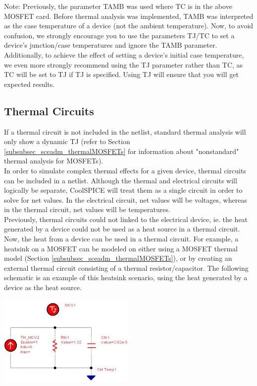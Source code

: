 Note: Previously, the parameter TAMB was used where TC is in the above MOSFET card. Before thermal analysis was implemented, TAMB was interpreted as the case temperature of a device (not the ambient temperature). Now, to avoid confusion, we strongly encourage you to use the parameters TJ/TC to set a device's junction/case temperatures and ignore the TAMB parameter. Additionally, to achieve the effect of setting a device's initial case temperature, we even more strongly recommend using the TJ parameter rather than TC, as TC will be set to TJ if TJ is specified. Using TJ will ensure that you will get expected results.
	
\subsection{Thermal Circuits}
\label{subsec_sceadm_thermalCircuits}

If a thermal circuit is not included in the netlist, standard thermal analysis will only show a dynamic TJ (refer to Section \ref{subsubsec_sceadm_thermalMOSFETs} for information about "nonstandard" thermal analysis for MOSFETs). \\

In order to simulate complex thermal effects for a given device, thermal circuits can be included in a netlist. Although the thermal and electrical circuits will logically be separate, CoolSPICE will treat them as a single circuit in order to solve for net values. In the electrical circuit, net values will be voltages, whereas in the thermal circuit, net values will be temperatures. \\

Previously, thermal circuits could not linked to the electrical device, ie. the heat generated by a device could not be used as a heat source in a thermal circuit. Now, the heat from a device can be used in a thermal circuit. For example, a heatsink on a MOSFET can be modeled on either using a MOSFET thermal model (Section \ref{subsubsec_sceadm_thermalMOSFETs}), or by creating an external thermal circuit consisting of a thermal resistor/capacitor. The following schematic is an example of this heatsink scenario, using the heat generated by a device as the heat source. \\

\centerline{\includegraphics[width=0.5\textwidth]
{./figures/thermal_figures/ThermalHeatsink.png}}

